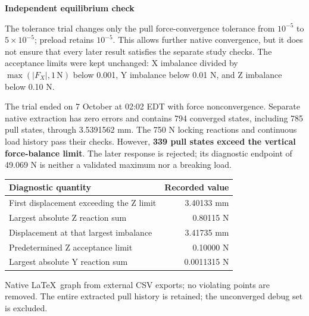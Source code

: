 \documentclass[10pt,a4paper]{article}
\newcommand{\PageTitle}[1]{{\LARGE\bfseries\color{Navy}#1\par}\vspace{7pt}}
\begin{document}
\clearpage
\PageTitle{Independent equilibrium check}
The tolerance trial changes only the pull force-convergence tolerance from $10^{-5}$ to $5\times10^{-5}$; preload retains $10^{-5}$. This allows further native convergence, but it does not ensure that every later result satisfies the separate study checks. The acceptance limits were kept unchanged: X imbalance divided by $\max(|F_X|,1\,\mathrm{N})$ below 0.001, Y imbalance below 0.01 N, and Z imbalance below 0.10 N.

The trial ended on 7 October at 02:02 EDT with force nonconvergence. Separate native extraction has zero errors and contains 794 converged states, including 785 pull states, through 3.5391562 mm. The 750 N locking reactions and continuous load history pass their checks. However, \textbf{339 pull states exceed the vertical force-balance limit}. The later response is rejected; its diagnostic endpoint of 49.069 N is neither a validated maximum nor a breaking load.

\begin{center}
\begin{tabular}{p{.64\linewidth}r}\toprule
Diagnostic quantity & Recorded value\\\midrule
First displacement exceeding the Z limit & 3.40133 mm\\
Largest absolute Z reaction sum & 0.80115 N\\
Displacement at that largest imbalance & 3.41735 mm\\
Predetermined Z acceptance limit & 0.10000 N\\
Largest absolute Y reaction sum & 0.0011315 N\\\bottomrule
\end{tabular}
\end{center}

\begin{center}
\end{center}
{\small Native \LaTeX\ graph from external CSV exports; no violating points are removed. The entire extracted pull history is retained; the unconverged debug set is excluded.}
\end{document}
